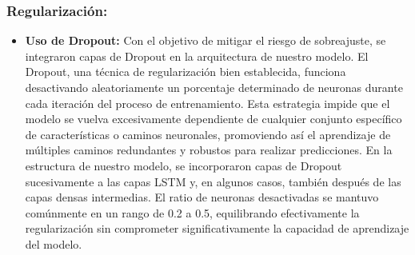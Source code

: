 \subsubsection{Regularización:} 
\begin{itemize}
    \item \textbf{Uso de Dropout:} Con el objetivo de mitigar el riesgo de sobreajuste, se integraron capas de Dropout en la arquitectura de nuestro modelo. El Dropout, una técnica de regularización bien establecida, funciona desactivando aleatoriamente un porcentaje determinado de neuronas durante cada iteración del proceso de entrenamiento. Esta estrategia impide que el modelo se vuelva excesivamente dependiente de cualquier conjunto específico de características o caminos neuronales, promoviendo así el aprendizaje de múltiples caminos redundantes y robustos para realizar predicciones. En la estructura de nuestro modelo, se incorporaron capas de Dropout sucesivamente a las capas LSTM y, en algunos casos, también después de las capas densas intermedias. El ratio de neuronas desactivadas se mantuvo comúnmente en un rango de 0.2 a 0.5, equilibrando efectivamente la regularización sin comprometer significativamente la capacidad de aprendizaje del modelo.
\end{itemize}

